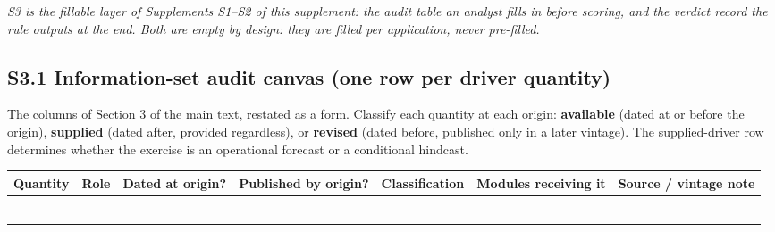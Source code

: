 \documentclass[11pt]{article}
\begin{document}
\emph{S3 is the fillable layer of Supplements S1--S2 of this supplement:
the audit table an analyst fills in before scoring, and the verdict
record the rule outputs at the end. Both are empty by design: they are
filled per application, never pre-filled.}

\subsection{S3.1 Information-set audit canvas (one row per driver
quantity)}\label{s3.1-information-set-audit-canvas-one-row-per-driver-quantity}

The columns of Section 3 of the main text, restated as a form. Classify
each quantity at each origin: \textbf{available} (dated at or before the
origin), \textbf{supplied} (dated after, provided regardless), or
\textbf{revised} (dated before, published only in a later vintage). The
supplied-driver row determines whether the exercise is an operational
forecast or a conditional hindcast.

{\def\LTcaptype{none} %
\begin{longtable}[]{@{}
  >{\raggedright\arraybackslash}p{}
  >{\raggedright\arraybackslash}p{}
  >{\raggedright\arraybackslash}p{}
  >{\raggedright\arraybackslash}p{}
  >{\raggedright\arraybackslash}p{}
  >{\raggedright\arraybackslash}p{}
  >{\raggedright\arraybackslash}p{}@{}}
\toprule\noalign{}
\begin{minipage}[b]{\linewidth}\raggedright
Quantity
\end{minipage} & \begin{minipage}[b]{\linewidth}\raggedright
Role
\end{minipage} & \begin{minipage}[b]{\linewidth}\raggedright
Dated at origin?
\end{minipage} & \begin{minipage}[b]{\linewidth}\raggedright
Published by origin?
\end{minipage} & \begin{minipage}[b]{\linewidth}\raggedright
Classification
\end{minipage} & \begin{minipage}[b]{\linewidth}\raggedright
Modules receiving it
\end{minipage} & \begin{minipage}[b]{\linewidth}\raggedright
Source / vintage note
\end{minipage} \\
\midrule\noalign{}
\endhead
\bottomrule\noalign{}
\endlastfoot
& & & & & & \\
& & & & & & \\
& & & & & & \\
& & & & & & \\
& & & & & & \\
& & & & & & \\
\end{longtable}
}
\end{document}
